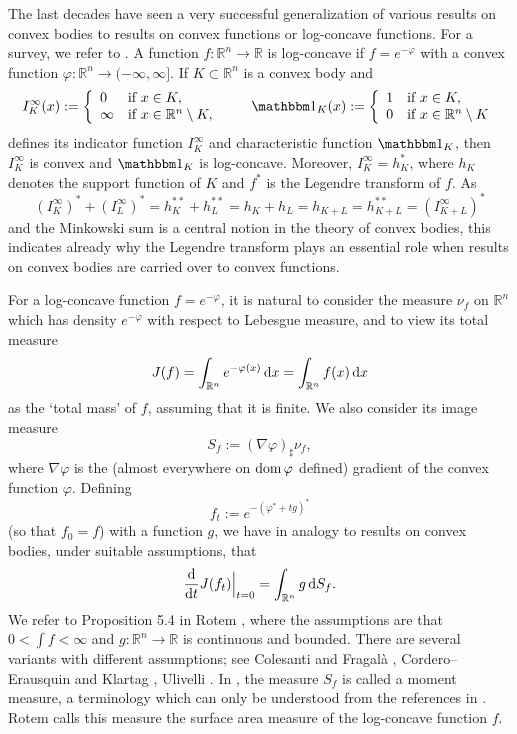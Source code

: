 \documentclass[12pt]{article}
\newcommand{\0}{\mbox{\boldmath$o$}}
\newcommand{\R}{{\mathbb R}}
\newcommand{\D}{{\rm d}}
\begin{document}
The last decades have seen a very successful generalization of various results on convex bodies to results on convex functions or log-concave functions. For a survey, we refer to \cite[Chap. 9]{AGM21}. A function $f:\R^n\to \R$ is log-concave if $f=e^{-\varphi}$ with a convex function $\varphi:\R^n\to(-\infty,\infty]$. If $K\subset\R^n$ is a convex body and
$$ I_K^\infty(x) :=\left\{\begin{array}{ll} 0 & \mbox{if } x\in K,\\ \infty & \mbox{if }x\in\R^n\setminus K, \end{array}\right.\qquad 
{\mathbbm 1}_K(x):=\left\{\begin{array}{ll} 1 & \mbox{if } x\in K,\\ 0 & \mbox{if }x\in\R^n\setminus K \end{array}\right.$$
defines its indicator function $I_K^\infty$ and characteristic function ${\mathbbm 1}_K$, then $I_K^\infty$ is convex and ${\mathbbm 1}_K$ is log-concave. Moreover,
$I_K^\infty= h_K^*$, where $h_K$ denotes the support function of $K$ and 
$f^*$ is the Legendre transform of $f$. As 
$$(I_K^\infty)^*+(I_L^\infty)^*= h_K^{**}+h_L^{**}=h_K+h_L=h_{K+L}=h_{K+L}^{**}= (I^\infty_{K+L})^*$$
and the Minkowski sum is a central notion in the theory of convex bodies, this indicates already why the Legendre transform plays an essential role when results on convex bodies are carried over to convex functions.

For a log-concave function $f=e^{-\varphi}$, it is natural to consider the measure $\nu_f$ on $\R^n$ which has density $e^{-\varphi}$ with respect to Lebesgue measure, and to view its total measure 
$$ J(f)= \int_{\R^n} e^{-\varphi(x)}\,\D x= \int_{\R^n}f(x)\,\D x$$
as the `total mass' of $f$, assuming that it is finite. We also consider its image measure
$$ S_f:= (\nabla\varphi)_\sharp\nu_f,$$
where $\nabla \varphi$ is the (almost everywhere on ${\rm dom}\,\varphi$ defined) gradient of the convex function $\varphi$. Defining
$$ f_t:= e^{-(\varphi^*+tg)^*}$$
(so that $f_0=f$) with a function $g$, we have in analogy to results on convex bodies, under suitable assumptions, that
\begin{equation}\label{1.6}
\frac{\D}{\D t} J(f_t)\Big|_{t=0} =\int_{\R^n} g\,\D S_f.
\end{equation}
We refer to Proposition 5.4 in Rotem \cite{Rot22}, where the assumptions are that $0<\int f<\infty$ and $g:\R^n\to\R$ is continuous and bounded. There are several variants with different assumptions; see Colesanti and Fragal\`a \cite{CF13}, Cordero--Erausquin and Klartag \cite{CK15}, Ulivelli \cite{Uli24}. In \cite[Def. 1]{CK15}, the measure $S_f$ is called a moment measure, a terminology which can only be understood from the references in \cite{CK15}. Rotem \cite{Rot22} calls this measure the surface area measure of the log-concave function $f$.
\end{document}
